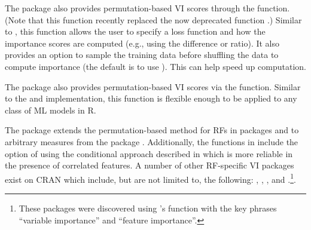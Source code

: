 The  package \citep{R-ingredients} also provides
permutation-based VI scores through the 
function. (Note that this function recently replaced the now deprecated
 function  \citep{R-DALEX}.)
Similar to , this function allows the user to
specify a loss function and how the importance scores are computed
(e.g., using the difference or ratio). It also provides an option to
sample the training data before shuffling the data to compute importance
(the default is to use ). This can help speed up
computation.

The  package \citep{R-mmpf} also provides
permutation-based VI scores via the 
function. Similar to the  and  implementation,
this function is flexible enough to be applied to any class of ML models
in R.

The  package \citep{R-varImp} extends the
permutation-based method for RFs in packages 
\citep{R-party} and  \citep{R-ranger} to arbitrary
measures from the  package \citep{R-measures}.
Additionally, the functions in  include the option of using
the conditional approach described in \citet{strobl-2019-conditional}
which is more reliable in the presence of correlated features. A number
of other RF-specific VI packages exist on CRAN which include, but are
not limited to, the following:  \citep{R-vita},
 \citep{R-rfVarImpOOB},
 \citep{R-randomForestExplainer}, and
 \citep{R-tree.interpreter}.\footnote{These
  packages were discovered using 's 
  function \citep{R-pkgsearch} with the key phrases ``variable
  importance'' and ``feature importance''.}.

